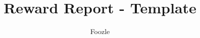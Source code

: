 \documentclass[12pt, a4paper, twocolumn]{article}
\title{Reward Report - Template}
\author{Foozle}
\begin{document}
\SystemDetails{%
}{%
}{%
}{%
}

\OptIntent{%
}{%
}{%
}{%
}

\Interfaces{%
}{%
}{%
}{%
}

\Implementation{%
}{%
}{%
}{%
}{%
}{%
}{%
}

\Evaluation{%
}{%
}{%
}{%
}

\Maintenance{%
}{%
}{%
}




\end{document}
